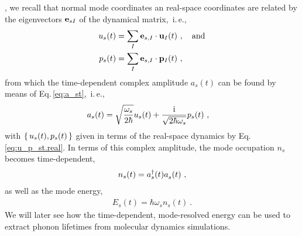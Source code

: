 , we recall that normal mode coordinates an real-space coordinates are related by the eigenvectors ${\bf e}_{sI}$ of the dynamical matrix,~i.\,e.,
%
\begin{subequations}
	\label{eq:u_p_st.real}
\begin{align}
u_s (t)
&= \sum_{I} {\bf e}_{s, I} \cdot {\bf u}_{I} (t)
~,\quad\text{and}
\label{eq:u_st.real)} \\
p_s (t)
&=\sum_{I} {\bf e}_{s, I} \cdot {\bf p}_{I} (t) ~,
\label{eq:p_st.real}
\end{align}
\end{subequations}
%
from which the time-dependent complex amplitude $a_s (t)$ can be found by means of Eq.\,\eqref{eq:a_st},~i.\,e.,
\begin{align}
		a_s (t)
		&= \sqrt{\frac{\omega_s}{2 \hbar}} u_s (t) + \frac{{\rm i}}{\sqrt{2 \hbar \omega_s}} p_s (t)~,
\end{align}
with $\set{u_s (t), p_s (t)}$ given in terms of the real-space dynamics by Eq.\,\eqref{eq:u_p_st.real}. In terms of this complex amplitude, the mode occupation $n_s$ becomes time-dependent,
\begin{align}
	n_s (t) = \D a_s (t) \fD a_s (t)~,
	\label{eq:n_s(t)}
\end{align}
as well as the mode energy,
\begin{align}
	E_s (t) = \hbar \omega_s n_s (t)~.
\end{align}
We will later see how the time-dependent, mode-resolved energy can be used to extract phonon lifetimes from molecular dynamics simulations.

